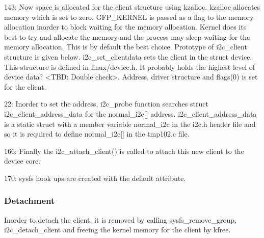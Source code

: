 \documentclass{article}
\begin{document}
143: Now space is allocated for the client structure using kzalloc. kzalloc allocates memory which is set to zero. GFP\_KERNEL is passed as a flag to the memory allocation inorder to block waiting for the memory allocation. Kernel does its best to try and allocate the memory and the process may sleep waiting for the memory allocation. This is by default the best choice. Prototype of i2c\_client structure is given below. i2c\_set\_clientdata sets the client in the struct device. This structure is defined in linux/device.h. It probably holds the highest level of device data? <TBD: Double check>. Address, driver structure and flags(0) is set for the client. 

22: Inorder to set the address, i2c\_probe function searches struct i2c\_client\_address\_data for the normal\_i2c[] address. i2c\_client\_address\_data is a static struct with a member variable normal\_i2c in the i2c.h header file and so it is required to define normal\_i2c[] in the tmp102.c file. 

166: Finally the i2c\_attach\_client() is called to attach this new client to the device core. 

170: sysfs hook ups are created with the default attribute. 

\subsubsection{Detachment}
Inorder to detach the client, it is removed by calling sysfs\_remove\_group, i2c\_detach\_client and freeing the kernel memory for the client by kfree. 
\end{document}
